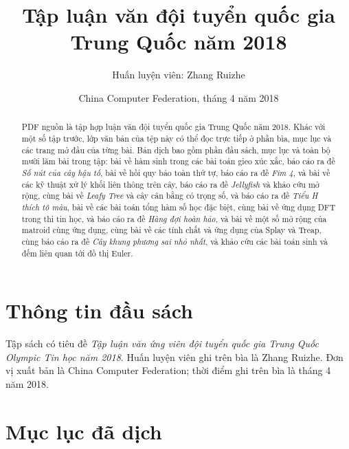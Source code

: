 \documentclass[11pt]{article}
\title{Tập luận văn đội tuyển quốc gia Trung Quốc năm 2018}
\author{Huấn luyện viên: Zhang Ruizhe}
\date{China Computer Federation, tháng 4 năm 2018}
\begin{document}
\maketitle


\renewcommand{\abstractname}{Tóm tắt}
\begin{abstract}
PDF nguồn là tập hợp luận văn đội tuyển quốc gia Trung Quốc năm 2018. Khác với
một số tập trước, lớp văn bản của tệp này có thể đọc trực tiếp ở phần bìa, mục
lục và các trang mở đầu của từng bài. Bản dịch bao gồm phần đầu sách, mục lục
và toàn bộ mười lăm bài trong tập: bài về hàm sinh trong các bài
toán gieo xúc xắc, báo cáo ra đề \emph{Số nút của cây hậu tố}, bài về hồi quy
bảo toàn thứ tự, báo cáo ra đề \emph{Fim 4}, và bài về các kỹ thuật xử lý khối
liên thông trên cây, báo cáo ra đề \emph{Jellyfish} và khảo cứu mở rộng, cùng
bài về \emph{Leafy Tree} và cây cân bằng có trọng số, và báo cáo ra đề
\emph{Tiểu H thích tô màu}, bài về các bài toán tổng hàm số học đặc biệt, cùng
bài về ứng dụng DFT trong thi tin học, và báo cáo ra đề \emph{Hàng đợi hoàn
hảo}, và bài về một số mở rộng của matroid cùng ứng dụng, cùng bài về các tính
chất và ứng dụng của Splay và Treap, cùng báo cáo ra đề \emph{Cây khung phương
sai nhỏ nhất}, và khảo cứu các bài toán sinh và đếm liên quan tới đồ thị Euler.
\end{abstract}

\section{Thông tin đầu sách}

Tập sách có tiêu đề \emph{Tập luận văn ứng viên đội tuyển quốc gia Trung Quốc
Olympic Tin học năm 2018}. Huấn luyện viên ghi trên bìa là Zhang Ruizhe. Đơn vị
xuất bản là China Computer Federation; thời điểm ghi trên bìa là tháng 4 năm
2018.

\section{Mục lục đã dịch}
\end{document}
